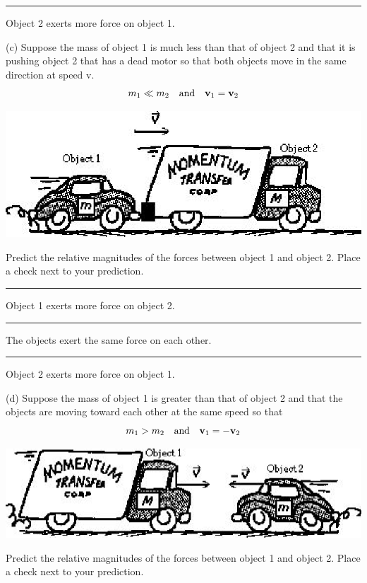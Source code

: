 \rule{0.5in}{0.1pt} Object 2 exerts more force on object 1.

(c) Suppose the mass of object 1 is much less than that of object 2 and that
it is pushing object 2 that has a dead motor so that both objects move in the
same direction at speed v.
\[
m_{1}\ll m_{2}\quad \mbox{and}\quad {{\bf v}_{1}}={{\bf v}_{2}}\]


\vspace{0.3cm}
{\par\centering \includegraphics{newtons_laws_fig3.eps} \par}
\vspace{0.3cm}

Predict the relative magnitudes of the forces between object 1 and object 2.
Place a check next to your prediction. 

\rule{0.5in}{0.1pt} Object 1 exerts more force on object 2. 

\rule{0.5in}{0.1pt} The objects exert the same force on each other. 

\rule{0.5in}{0.1pt} Object 2 exerts more force on object 1.

(d) Suppose the mass of object 1 is greater than that of object 2 and that the
objects are moving toward each other at the same speed so that
\[
m_{1}>m_{2}\quad \mbox{and}\quad {{\bf v}_{1}}=-{{\bf v}_{2}}\]


\vspace{0.3cm}
{\par\centering \includegraphics{newtons_laws_fig4.eps} \par}
\vspace{0.3cm}

Predict the relative magnitudes of the forces between object 1 and object 2.
Place a check next to your prediction. 

